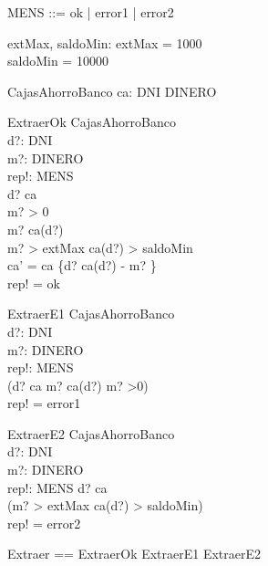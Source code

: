 \documentclass{article}
\begin{document}
\begin{zed}
 [DNI] 
\end{zed}



\begin{zed} 
    MENS ::= ok | error1 | error2
\end{zed}



\begin{axdef}
 extMax, saldoMin: \nat
 \where
 extMax = 1000 \\
 saldoMin = 10000
\end{axdef}




\begin{schema}{CajasAhorroBanco}
 ca: DNI \pfun DINERO
\end{schema}


\begin{schema}{ExtraerOk}
 \Delta CajasAhorroBanco \\
 d?: DNI \\
 m?: DINERO \\
 rep!: MENS \\
\where
 d? \in \dom ca \\
 m? > 0 \\
 m? \leq ca(d?) \\
 m? > extMax \implies ca(d?) > saldoMin \\
 ca' = ca \oplus \{d? \mapsto ca(d?) - m? \} \\
 rep! = ok

\end{schema}


\begin{schema}{ExtraerE1}
 \Xi CajasAhorroBanco \\
 d?: DNI \\
 m?: DINERO \\
 rep!: MENS \\
\where
\lnot(d? \in \dom ca \land m? \leq ca(d?) \land m? >0) \\
rep! = error1
\end{schema}


\begin{schema}{ExtraerE2}
 \Xi CajasAhorroBanco \\
 d?: DNI \\
 m?: DINERO \\
 rep!: MENS 
\where
 d? \in \dom ca \\
  \lnot(m? > extMax \implies ca(d?) > saldoMin) \\
 rep! = error2
\end{schema}


\begin{zed}
  Extraer == ExtraerOk \lor ExtraerE1 \lor ExtraerE2
\end{zed}
\end{document}
